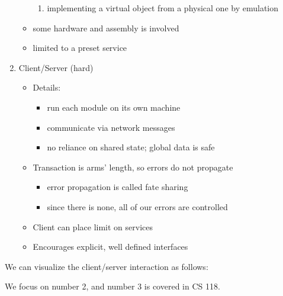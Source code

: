 \documentclass[../../lecture_notes.tex]{subfiles}
\begin{document}
\begin{enumerate}
\begin{itemize}
\begin{enumerate}
				\item implementing a virtual object from a physical one by emulation
			\end{enumerate}
		\item some hardware and assembly is involved
		\item limited to a preset service
	\end{itemize}
\item Client/Server (hard)
	\begin{itemize}
		\item Details:
			\begin{itemize}
				\item run each module on its own machine 
				\item communicate via network messages
				\item no reliance on shared state; global data is safe
			\end{itemize}
		\item Transaction is arms’ length, so errors do not propagate
			\begin{itemize}
				\item error propagation is called fate sharing
				\item since there is none, all of our errors are controlled
			\end{itemize}
			\item Client can place limit on services
			\item Encourages explicit, well defined interfaces
	\end{itemize}
\end{enumerate}

We can visualize the client/server interaction as follows:
\begin{center}
\end{center}


We focus on number 2, and number 3 is covered in CS 118.
\end{document}
